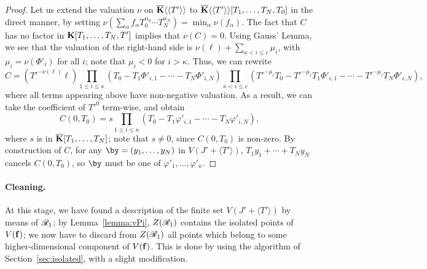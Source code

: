 \documentclass[12pt]{article}
\begin{document}
\begin{proof}
  Let us extend the valuation $\nu$ on $\overline{\mathbf{K}}\langle\langle T'\rangle\rangle$
to $\overline{\mathbf{K}}\langle\langle T' \rangle\rangle[T_1,\dots,T_N,T_0]$ in the
  direct manner, by setting $\nu(\sum_\alpha f_\alpha T_0^{\alpha_0}
  \cdots T_N^{\alpha_N}) = \min_\alpha \nu(f_\alpha)$. The fact that
  $C$ has no factor in $\mathbf{K}[T_1,\dots,T_N,T']$ implies that
  $\nu(C)=0$. Using Gauss' Lemma, we see that the valuation of the
  right-hand side is $\nu(\ell) + \sum_{\kappa < i \le c}\mu_i$, with $\mu_i= \nu(\Phi'_i)$ for all $i$;
  note that $\mu_i < 0$ for $i > \kappa$. Thus, we can
  rewrite
  $$C =\left ({T'}^{-\nu(\ell)} \ell\right ) 
  \prod_{1 \le i \le \kappa}(T_0-T_1 \Phi'_{i,1} - \cdots - T_N  \Phi'_{i,N} )
  \prod_{\kappa < i \le c} ({T'}^{-\mu_i}T_0-{T'}^{-\mu_i}T_1 \Phi'_{i,1} - \cdots - {T'}^{-\mu_i}T_N  \Phi'_{i,N} ),$$
  where all terms appearing above have non-negative valuation.
  As a result, we can take the coefficient of ${T'}^0$ term-wise,
  and obtain
  $$C(0,T_0) = s \prod_{1 \le i \le \kappa}(T_0-T_1 \varphi'_{i,1} -
  \cdots - T_N \varphi'_{i,N} ),$$ where $s$ is in $\overline{\mathbf{K}}[T_1,\dots,T_N]$;
  note that $s \ne 0$, since $C(0,T_0)$ is non-zero.
 By construction of $C$, for any
  $\by=(y_1,\dots,y_N)$ in $V(J'+\langle T' \rangle)$, $T_1 y_1 + \cdots + T_N y_N$
  cancels $C(0,T_0)$, so $\by$ must be one of
  $\varphi'_1,\dots,\varphi'_{\kappa}$.
\end{proof}

\paragraph{Cleaning.}
At this stage, we have found a description of the finite set
$V(J'+\langle T'\rangle)$ by means of $\mathscr{R}_1$; by Lemma~\ref{lemma:vPi}, $Z(\mathscr{R}_1)$ contains the
isolated points of $V(\mathbf{f})$; we now have to discard from  $Z(\mathscr{R}_1)$
all points which belong to some higher-dimensional component of
$V(\mathbf{f})$.  This is done by using the algorithm of
Section~\ref{sec:isolated}, with a slight modification.

 

\end{document}

